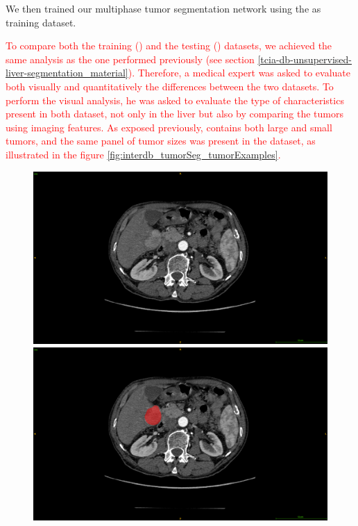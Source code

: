 We then trained our multiphase tumor segmentation network using the \textbf{} as training dataset.
\textcolor{red}
{
To compare both the training (\textbf{}) and the testing (\textbf{}) datasets, we achieved the same analysis as the one performed previously (see section \ref{tcia-db-unsupervised-liver-segmentation_material}).
Therefore, a medical expert was asked to evaluate both visually and quantitatively the differences between the two datasets.
To perform the visual analysis, he was asked to evaluate the type of characteristics present in both dataset, not only in the liver but also by comparing the tumors using imaging features. 
As exposed previously, \textbf{} contains both large and small tumors, and the same panel of tumor sizes was present in the \textbf{} dataset, as illustrated in the figure \ref{fig:interdb_tumorSeg_tumorExamples}.
\begin{figure}[!ht]
	\begin{mdframed}[backgroundcolor=blue!50,linecolor=blue!50]
		\centering
		\begin{minipage}{0.45\linewidth}
			\includegraphics[width=\linewidth]{images/GDB_examplePatientSmallTumor}
		\end{minipage} \hspace{-0.1cm}
		\begin{minipage}{0.45\linewidth}
			\includegraphics[width=\linewidth]{images/GDB_examplePatientSmallTumor_seg}

\end{minipage}
\end{mdframed}
\end{figure}}
